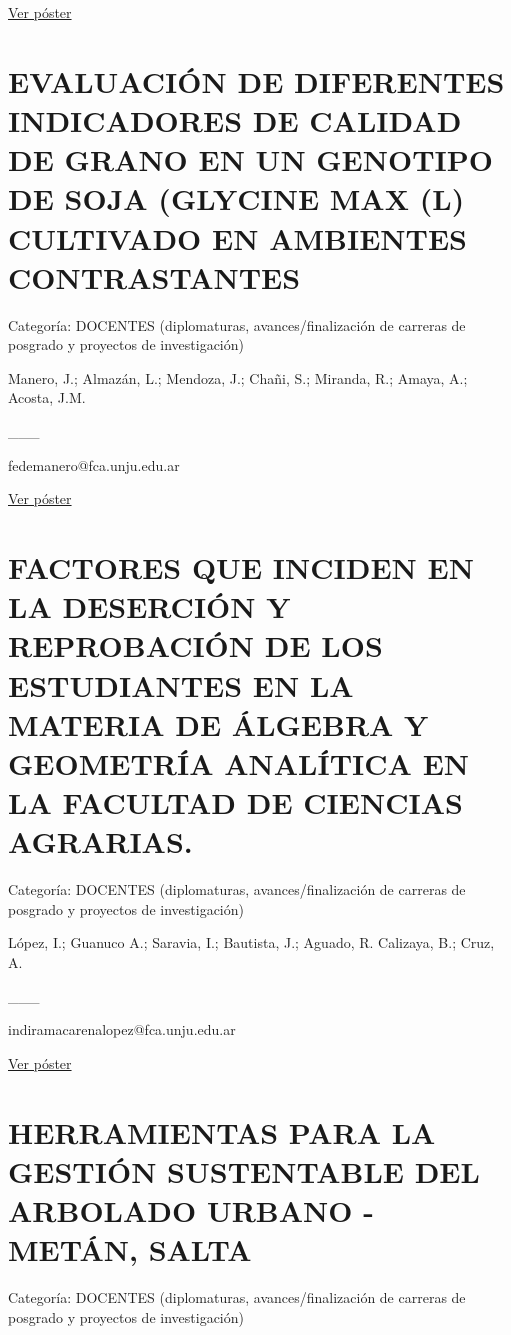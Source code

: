 \documentclass[
  spanish,
  letterpaper,
  DIV=11,
  numbers=noendperiod]{scrreprt}
\begin{document}
\href{https://drive.google.com/open?id=11IEyQTkmK9ypRRcDWYAk66J7COlsmUZ7}{Ver
póster}

\section{EVALUACIÓN DE DIFERENTES INDICADORES DE CALIDAD DE GRANO EN UN
GENOTIPO DE SOJA (GLYCINE MAX (L) CULTIVADO EN AMBIENTES
CONTRASTANTES}\label{evaluaciuxf3n-de-diferentes-indicadores-de-calidad-de-grano-en-un-genotipo-de-soja-glycine-max-l-cultivado-en-ambientes-contrastantes}

Categoría: DOCENTES (diplomaturas, avances/finalización de carreras de
posgrado y proyectos de investigación)

Manero, J.; Almazán, L.; Mendoza, J.; Chañi, S.; Miranda, R.; Amaya, A.;
Acosta, J.M.

\_\_\_

fedemanero@fca.unju.edu.ar

\href{https://drive.google.com/open?id=1D_UHiR_A7Q7E3EGQjA8TI3n_bzXz5wYW}{Ver
póster}

\section{FACTORES QUE INCIDEN EN LA DESERCIÓN Y REPROBACIÓN DE LOS
ESTUDIANTES EN LA MATERIA DE ÁLGEBRA Y GEOMETRÍA ANALÍTICA EN LA
FACULTAD DE CIENCIAS
AGRARIAS.}\label{factores-que-inciden-en-la-deserciuxf3n-y-reprobaciuxf3n-de-los-estudiantes-en-la-materia-de-uxe1lgebra-y-geometruxeda-analuxedtica-en-la-facultad-de-ciencias-agrarias.}

Categoría: DOCENTES (diplomaturas, avances/finalización de carreras de
posgrado y proyectos de investigación)

López, I.; Guanuco A.; Saravia, I.; Bautista, J.; Aguado, R. Calizaya,
B.; Cruz, A.

\_\_\_

indiramacarenalopez@fca.unju.edu.ar

\href{https://drive.google.com/open?id=1SmJTqJQYZryQRvrIvD8VJCQtV5otNWAn}{Ver
póster}

\section{HERRAMIENTAS PARA LA GESTIÓN SUSTENTABLE DEL ARBOLADO URBANO -
METÁN,
SALTA}\label{herramientas-para-la-gestiuxf3n-sustentable-del-arbolado-urbano---metuxe1n-salta}

Categoría: DOCENTES (diplomaturas, avances/finalización de carreras de
posgrado y proyectos de investigación)
\end{document}
